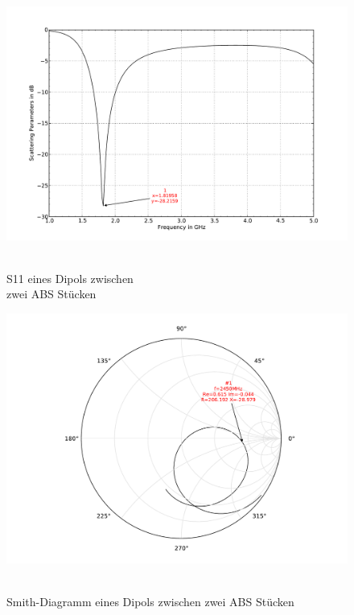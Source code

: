 \begin{figure}[!ht]
\begin{center}
  \includegraphics[width=\linewidth]{content/bilder/Evaluation/Dipol/S11DipolZweiABS.pdf}
  \caption{\\S11 eines Dipols zwischen \\zwei ABS Stücken}\label{fig:S11_Dipol_Zwei_ABS_5}
\endminipage%
{}
  \includegraphics[width=\linewidth]{content/bilder/Evaluation/Dipol/SmithDipolZweiABS.pdf}
  \caption{\\Smith-Diagramm eines Dipols zwischen zwei ABS Stücken}\label{fig:Smith_Dipol_Zwei_ABS_6}
\endminipage
\end{center}
\end{figure}

